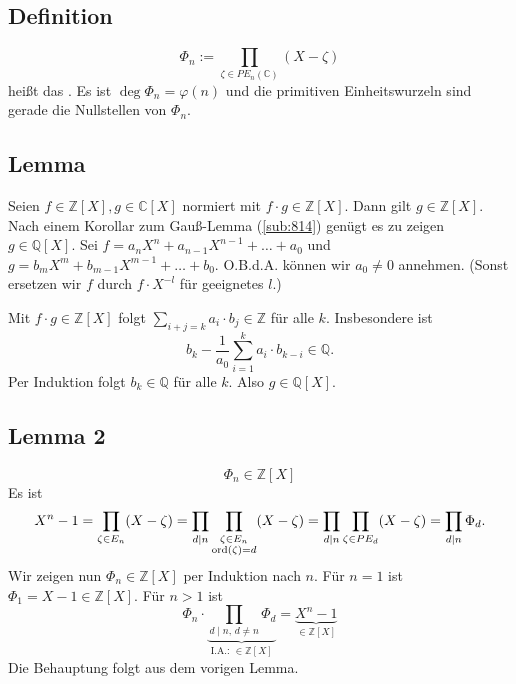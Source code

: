 \subsection[Definition: $n$-tes Kreisteilungspolynom]{Definition} %
\label{sub:1911}
\[
	\Phi_n := \prod_{\zeta \in PE_n(\mathds{C})} (X- \zeta)
\]
heißt das . Es ist $\deg \Phi_n = \varphi(n)$ und die primitiven
Einheitswurzeln sind gerade die Nullstellen von $\Phi_n$.

\subsection[Lemma: Folgerung aus dem Gauß-Lemma]{Lemma} %
\label{sub:1912}
Seien $f \in \mathds{Z}[X], g \in \mathds{C}[X]$ normiert mit $f \cdot g \in \mathds{Z}[X]$. Dann gilt $g \in \mathds{Z}[X]$.
Nach einem Korollar zum Gauß-Lemma (\ref{sub:814}) genügt es zu zeigen $g \in\mathds{Q}[X]$. Sei $f = a_n X^n + a_{n-1} X^{n-1} + \ldots + a_0$ und $g = b_m X^m + b_{m-1} X^{m-1} + \ldots + b_0$.
O.B.d.A. können wir $a_0 \not= 0$ annehmen. (Sonst ersetzen wir $f$ durch $f \cdot X^{-l}$ für geeignetes $l$.)

Mit $f \cdot g \in \mathds{Z}[X]$ folgt $\sum_{i+j=k} a_i \cdot b_j \in \mathds{Z}$ für alle $k$. Insbesondere ist 
\[
	b_k - \frac{1}{a_0} \sum_{i=1}^{k} a_i \cdot b_{k-i} \in \mathds{Q}. 
\]
Per Induktion folgt $b_k \in \mathds{Q}$ für alle $k$. Also $g \in \mathds{Q}[X]$. \bewende

\subsection[{Lemma 2: Das Kreisteilungspolynom liegt in $\mathds{Z}[X]$}]{Lemma 2} %
\label{sub:1913}
\[
	\Phi_n \in \mathds{Z}[X]
\]
Es ist 
\begin{align*}
	X^n-1 = \prod_{\zeta \in E_n} (X- \zeta) = \prod_{d \mid n} \prod_{\substack{\zeta \in E_n \\ \operatorname{ord} (\zeta) =d}} (X- \zeta) = \prod_{d \mid n} \prod_{\zeta \in PE_d} (X- \zeta) 
	= \prod_{d \mid n} \Phi_d.
\end{align*}
Wir zeigen nun $\Phi_n \in \mathds{Z}[X]$ per Induktion nach $n$. Für $n=1$ ist $\Phi_1 = X-1 \in \mathds{Z}[X]$. Für $n>1$ ist
\[
	\Phi_n \cdot \underbrace{\prod_{d \mid n , \, d \not= n} \Phi_d}_{\text{I.A.: } \in \mathds{Z}[X]} = \underbrace{X^n-1 }_{\in \mathds{Z}[X]}
\]
Die Behauptung folgt aus dem vorigen Lemma. \bewende

